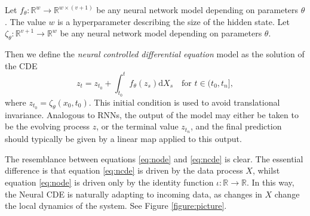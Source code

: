 \documentclass{article}
\theoremstyle{plain}
\theoremstyle{definition}
\newcommand{\reals}{\mathbb{R}}
\begin{document}
	Let $f_\theta \colon \reals^w \to \reals^{w \times (v + 1)}$ be any neural network model depending on parameters $\theta$. The value $w$ is a hyperparameter describing the size of the hidden state. Let $\zeta_\theta \colon \reals^{v + 1} \to \reals^w$ be any neural network model depending on parameters $\theta$.
	
	Then we define the \emph{neural controlled differential equation} model as the solution of the CDE
	\begin{equation}\label{eq:ncde}
	z_t = z_{t_0} + \int_{t_0}^t f_\theta(z_s) \mathrm{d} X_s\quad\text{for $t \in (t_0, t_n]$},
	\end{equation}
	where $z_{t_0} = \zeta_\theta(x_0, t_0)$. This initial condition is used to avoid translational invariance. Analogous to RNNs, the output of the model may either be taken to be the evolving process $z$, or the terminal value $z_{t_n}$, and the final prediction should typically be given by a linear map applied to this output.
	
	The resemblance between equations \eqref{eq:node} and \eqref{eq:ncde} is clear. The essential difference is that equation \eqref{eq:ncde} is driven by the data process $X$, whilst equation \eqref{eq:node} is driven only by the identity function $\iota \colon \reals \to \reals$. In this way, the Neural CDE is naturally adapting to incoming data, as changes in $X$ change the local dynamics of the system. See Figure \ref{figure:picture}.
	
\newcommand{\mainpicturedata}{
	\draw[thick, ->] (-1, 0) -- (5, 0);
	\node at (0, 0)[circle,fill, inner sep=1.5pt] {};
	\node at (0.6, 0)[circle,fill, inner sep=1.5pt] {};
	\node at (2, 0)[circle,fill, inner sep=1.5pt] {};
	\node at (4, 0)[circle,fill, inner sep=1.5pt] {};
	\node at (0, -0.3) {$t_1$};
	\node at (0.6, -0.3) {$t_2$};
	\node at (2, -0.3) {$t_3$};
	\node at (3, -0.3) {$\cdots$};
	\node at (4, -0.3) {$t_n$};
	\node at (5.6, 0) {Time};
	
	\draw[blue!80!white, thick, cap=round] (-1, 0.3) .. controls ++(45:0.5) and ++(185:0.2) .. (0, 1);
	\draw[blue!80!white, thick, cap=round] (0, 1) .. controls ++(185+180:0.2) and ++(135:0.4) .. (0.6, 0.7);
	\draw[blue!80!white, thick, cap=round] (0.6, 0.7) .. controls ++(135+180:0.4) and ++ (190:0.3) .. (2, 0.6);
	\draw[blue!80!white, thick, cap=round] (2, 0.6) .. controls ++(190+180:0.3) and ++ (135:0.7) .. (4, 0.8);
	\draw[blue!80!white, thick, cap=round] (4, 0.8) .. controls ++(135+180:0.7) and ++(200:0.2) .. (5, 0.6);
	\node at (0, 1)[circle,draw=black, fill=cyan, inner sep=1.5pt] {};
	\node at (0.6, 0.7)[circle,draw=black, fill=cyan, inner sep=1.5pt] {};
	\node at (2, 0.6)[circle,draw=black, fill=cyan, inner sep=1.5pt] {};
	\node at (4, 0.8)[circle,draw=black, fill=cyan, inner sep=1.5pt] {};
	\node at (0, 0.7) {$x_1$};
	\node at (0.6, 0.4) {$x_2$};
	\node at (2, 0.3) {$x_3$};
	\node at (4, 0.5) {$x_n$};
	\node at (5.6, 0.6) {Data $\mathbf{x}$};
	}
	
\end{document}
